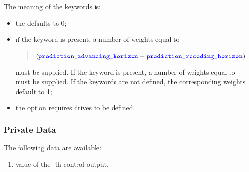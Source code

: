 The meaning of the keywords is:
\begin{itemize}
\item the  defaults to 0;

\item if the keyword  is present,
a number of weights  equal to
\begin{quote}
$(\textcolor{blue}{\texttt{prediction\_advancing\_horizon}} - \textcolor{blue}{\texttt{prediction\_receding\_horizon}})$
\end{quote}
must be supplied.
If the keyword  is present,
a number of weights  equal to 
must be supplied.
If the keywords are not defined, the corresponding weights
default to 1;

\item the 
option requires  drives to be defined.
\end{itemize}

\subsubsection{Private Data}
The following data are available:
\begin{enumerate}
\item {} value of the -th control output.
\end{enumerate}

